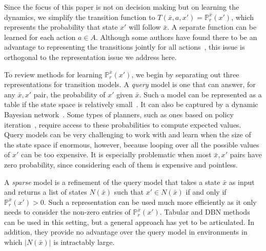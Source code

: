 \documentclass[letterpaper]{article} %
\begin{document}
Since the focus of this paper is not on decision making but on learning the dynamics, we simplify the transition function to $T(\bar{x},a,x')=\mathbb{P}^{\bar{x}}_{r}(x')$, which represents the probability that state $x'$ will follow $\bar{x}$. A separate function can be learned for each action $a\in A$. Although some authors have found there to be an advantage to representing the transitions jointly for all actions~\cite{oh15}, this issue is orthogonal to the representation issue we address here.

To review methods for learning $\mathbb{P}^{\bar{x}}_{r}(x')$, we begin by separating out three representations for transition models. A \emph{query}
model is one that can answer, for any $\bar{x},x'$ pair, the probability of $x'$ given $\bar{x}$. Such a model can be represented as a table if the state space is relatively small~\cite{kearns02}. It can also be captured by a dynamic Bayesian network~\cite{kearns99d,degris2006learning}.
Some types of planners, such as ones based on policy iteration~\cite{Puterman94}, require access to these probabilities to compute expected values.
Query models can be very challenging to work with and learn when the size of the state space if enormous, however, because looping over all the possible values of $x'$ can be too expensive. It is especially problematic when most $\bar{x},x'$ pairs have zero probability, since considering each of them is expensive and pointless.

A \emph{sparse} model is a refinement of the query model that takes a state $\bar{x}$ as input and returns a list of states $N(\bar{x})$ such that $x' \in N(\bar{x})$ if and only if $\mathbb{P}^{\bar{x}}_{r}(x')>0$. Such a representation can be used much more efficiently as it only needs to consider the non-zero entries of $\mathbb{P}^{\bar{x}}_{r}(x')$. Tabular and DBN methods can be used in this setting, but a general approach has yet to be articulated. In addition, they provide no advantage over the query model in environments in which $|N(\bar{x})|$ is intractably large.
\end{document}

